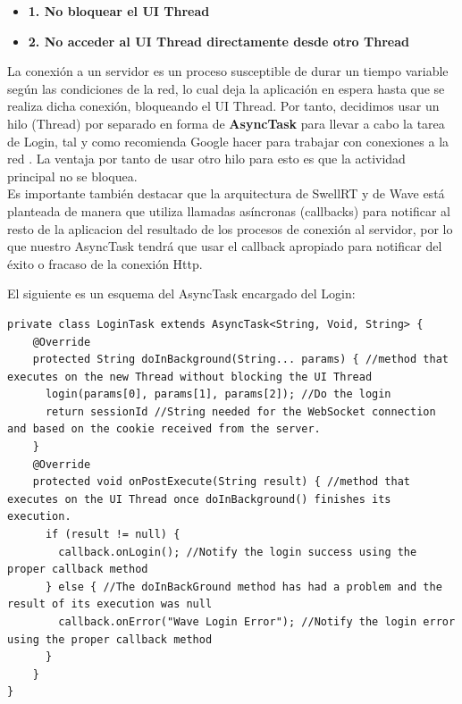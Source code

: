 	  \begin{itemize}
	  	\item \textbf{1. No bloquear el UI Thread}
	  	\item \textbf{2. No acceder al UI Thread directamente desde otro Thread}
	  \end{itemize}
	  
	  La conexión a un servidor es un proceso susceptible de durar un tiempo variable según las condiciones de la red, lo cual deja la aplicación en espera hasta que se realiza dicha conexión,  bloqueando el UI Thread. Por tanto, decidimos usar un hilo (Thread) por separado en forma de \textbf{AsyncTask} \cite{ref:android_asynctask} para llevar a cabo la tarea de Login, tal y como recomienda Google hacer para trabajar con conexiones a la red \cite{ref:android_networking}. La ventaja por tanto de usar otro hilo para esto es que la actividad principal no se bloquea. \\[.2cm]
	  	 
	 Es importante también destacar que la arquitectura de SwellRT y de Wave está planteada de manera que utiliza llamadas asíncronas (callbacks) para notificar al resto de la aplicacion del resultado de los procesos de conexión al servidor, por lo que nuestro AsyncTask tendrá que usar el callback apropiado para notificar del éxito o fracaso de la conexión Http.
	 
	  El siguiente es un esquema del AsyncTask encargado del Login: \\[.2cm]
	  
	  \begin{lstlisting}[frame=single]	  
private class LoginTask extends AsyncTask<String, Void, String> {
    @Override
    protected String doInBackground(String... params) { //method that executes on the new Thread without blocking the UI Thread
      login(params[0], params[1], params[2]); //Do the login 
      return sessionId //String needed for the WebSocket connection and based on the cookie received from the server.     
    }
    @Override
    protected void onPostExecute(String result) { //method that executes on the UI Thread once doInBackground() finishes its execution.    
      if (result != null) { 
        callback.onLogin(); //Notify the login success using the proper callback method
      } else { //The doInBackGround method has had a problem and the result of its execution was null
        callback.onError("Wave Login Error"); //Notify the login error using the proper callback method
      }
    }
}    
	  \end{lstlisting} 
	  
